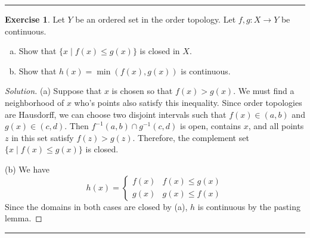 \documentclass{article}
\theoremstyle{definition}
\newtheorem{exercise}{Exercise}[section]
\begin{document}
\hrule

\begin{exercise}
  Let $Y$ be an ordered set in the order topology. Let $f,g:X\to Y$ be continuous.
  \begin{enumerate}[(a)]
    \item Show that $\{x\mid f(x)\le g(x)\}$ is closed in $X$.
    \item Show that $h(x) = \min(f(x), g(x))$ is continuous.
  \end{enumerate}
\end{exercise}
\begin{proof}[Solution]
  (a) Suppose that $x$ is chosen so that $f(x) > g(x)$. We must find a neighborhood of $x$ who's points also satisfy this inequality. Since order topologies are Hausdorff, we can choose two disjoint intervals such that $f(x)\in (a,b)$ and $g(x)\in (c,d)$. Then $f^{-1}(a,b) \cap g^{-1}(c,d)$ is open, contains $x$, and all points $z$ in this set satisfy $f(z) > g(z)$. Therefore, the complement set $\{x\mid f(x) \le g(x)\}$ is closed.

  (b) We have
  $$h(x) = \begin{cases}
    f(x) & f(x)\le g(x) \\
    g(x) & g(x)\le f(x)
  \end{cases}$$
  Since the domains in both cases are closed by (a), $h$ is continuous by the pasting lemma.
\end{proof}

\hrule
\end{document}

